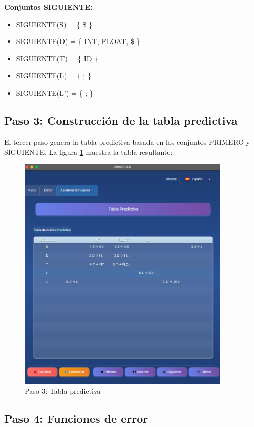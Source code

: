 \textbf{Conjuntos SIGUIENTE:}
\begin{itemize}
    \item SIGUIENTE(S) = \{ \$ \}
    \item SIGUIENTE(D) = \{ INT, FLOAT, \$ \}
    \item SIGUIENTE(T) = \{ ID \}
    \item SIGUIENTE(L) = \{ ; \}
    \item SIGUIENTE(L') = \{ ; \}
\end{itemize}

\subsection{Paso 3: Construcción de la tabla predictiva}

El tercer paso genera la tabla predictiva basada en los conjuntos PRIMERO y SIGUIENTE. La figura \ref{fig:ejemplo_simulador_paso3} muestra la tabla resultante:

\needspace{8cm}
\begin{figure}[H]
    \centering
    \includegraphics[width=0.9\textwidth]{figuras/ejemplo_practico/simulador_paso3.png}
    \caption{Paso 3: Tabla predictiva}
    \label{fig:ejemplo_simulador_paso3}
\end{figure}

\subsection{Paso 4: Funciones de error}

